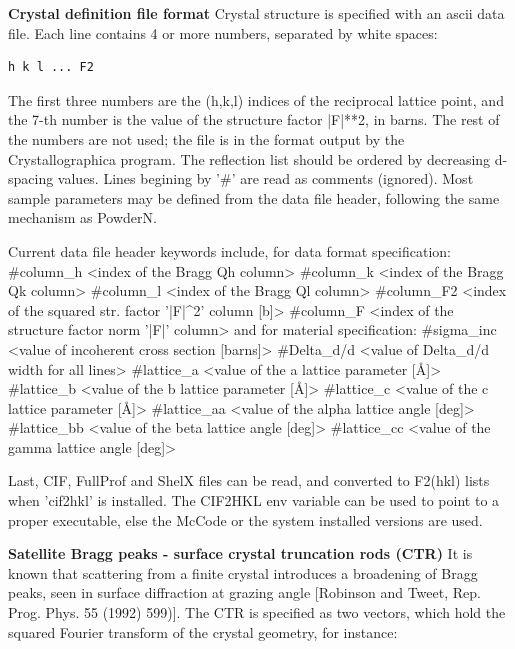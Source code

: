 \textbf{Crystal definition file format} Crystal structure is specified with an ascii data file. Each line contains 4 or more numbers, separated by white spaces:

\begin{verbatim}
h k l ... F2
\end{verbatim}

The first three numbers are the (h,k,l) indices of the reciprocal lattice point, and the 7-th number is the value of the structure factor |F|**2, in barns. The rest of the numbers are not used; the file is in the format output by the Crystallographica program. The reflection list should be ordered by decreasing d-spacing values. Lines begining by '\#' are read as comments (ignored). Most sample parameters may be defined from the data file header, following the same mechanism as PowderN.

Current data file header keywords include, for data format specification: \#column\_h \textless{}index of the Bragg Qh column\textgreater{} \#column\_k \textless{}index of the Bragg Qk column\textgreater{} \#column\_l \textless{}index of the Bragg Ql column\textgreater{} \#column\_F2 \textless{}index of the squared str. factor '|F|\textasciicircum{}2' column [b]\textgreater{} \#column\_F \textless{}index of the structure factor norm '|F|' column\textgreater{} and for material specification: \#sigma\_inc \textless{}value of incoherent cross section [barns]\textgreater{} \#Delta\_d/d \textless{}value of Delta\_d/d width for all lines\textgreater{} \#lattice\_a \textless{}value of the a lattice parameter [\AA{}]\textgreater{} \#lattice\_b \textless{}value of the b lattice parameter [\AA{}]\textgreater{} \#lattice\_c \textless{}value of the c lattice parameter [\AA{}]\textgreater{} \#lattice\_aa \textless{}value of the alpha lattice angle [deg]\textgreater{} \#lattice\_bb \textless{}value of the beta lattice angle [deg]\textgreater{} \#lattice\_cc \textless{}value of the gamma lattice angle [deg]\textgreater{}

Last, CIF, FullProf and ShelX files can be read, and converted to F2(hkl) lists when 'cif2hkl' is installed. The CIF2HKL env variable can be used to point to a proper executable, else the McCode or the system installed versions are used.

\textbf{Satellite Bragg peaks - surface crystal truncation rods (CTR)} It is known that scattering from a finite crystal introduces a broadening of Bragg peaks, seen in surface diffraction at grazing angle [Robinson and Tweet, Rep. Prog. Phys. 55 (1992) 599)]. The CTR is specified as two vectors, which hold the squared Fourier transform of the crystal geometry, for instance:

